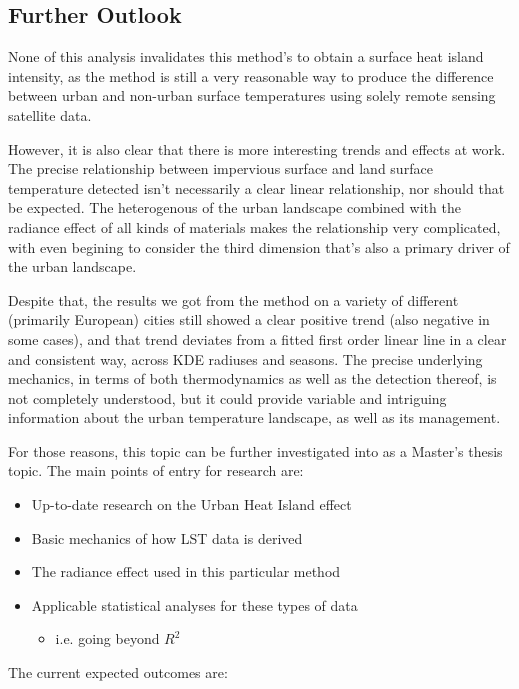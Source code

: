 \documentclass{article}
\begin{document}
\subsection{Further Outlook}
None of this analysis invalidates this method's to obtain a surface heat island intensity, as the method is still a very reasonable way to produce the difference between urban and non-urban surface temperatures using solely remote sensing satellite data.

However, it is also clear that there is more interesting trends and effects at work. The precise relationship between impervious surface and land surface temperature detected isn't necessarily a clear linear relationship, nor should that be expected. The heterogenous of the urban landscape combined with the radiance effect of all kinds of materials makes the relationship very complicated, with even begining to consider the third dimension that's also a primary driver of the urban landscape.

Despite that, the results we got from the method on a variety of different (primarily European) cities still showed a clear positive trend (also negative in some cases), and that trend deviates from a fitted first order linear line in a clear and consistent way, across KDE radiuses and seasons. The precise underlying mechanics, in terms of both thermodynamics as well as the detection thereof, is not completely understood, but it could provide variable and intriguing information about the urban temperature landscape, as well as its management.

For those reasons, this topic can be further investigated into as a Master's thesis topic. The main points of entry for research are:

\begin{itemize}
    \item Up-to-date research on the Urban Heat Island effect
    \item Basic mechanics of how LST data is derived
    \item The radiance effect used in this particular method
    \item Applicable statistical analyses for these types of data
    \begin{itemize}
        \item i.e. going beyond $R^2$
    \end{itemize}
\end{itemize}



The current expected outcomes are:
\end{document}
